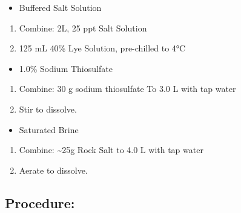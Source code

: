 \documentclass[
]{book}
\providecommand{\tightlist}{%
  \setlength{\itemsep}{0pt}\setlength{\parskip}{0pt}}
\begin{document}
\begin{itemize}
\tightlist
\item
  Buffered Salt Solution
\end{itemize}

\begin{enumerate}
\def\labelenumi{\arabic{enumi}.}
\tightlist
\item
  Combine: 2L, 25 ppt Salt Solution
\item
  125 mL 40\% Lye Solution, pre-chilled to 4°C
\end{enumerate}

\begin{itemize}
\tightlist
\item
  1.0\% Sodium Thiosulfate
\end{itemize}

\begin{enumerate}
\def\labelenumi{\arabic{enumi}.}
\tightlist
\item
  Combine: 30 g sodium thiosulfate To 3.0 L with tap water
\item
  Stir to dissolve.
\end{enumerate}

\begin{itemize}
\tightlist
\item
  Saturated Brine
\end{itemize}

\begin{enumerate}
\def\labelenumi{\arabic{enumi}.}
\tightlist
\item
  Combine: \textasciitilde25g Rock Salt to 4.0 L with tap water
\item
  Aerate to dissolve.
\end{enumerate}

\hypertarget{procedure-1}{%
\subsection{Procedure:}\label{procedure-1}}
\end{document}
